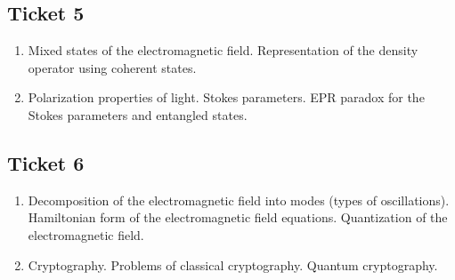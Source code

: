\subsection*{Ticket 5} 
\begin{enumerate}
\item Mixed states of the electromagnetic field.
Representation of the density operator using coherent
states. 
\item Polarization properties of light. Stokes parameters. EPR paradox
  for the Stokes parameters and entangled states.  
\end{enumerate}

\subsection*{Ticket 6} 
\begin{enumerate}
\item Decomposition of the electromagnetic field into modes (types of oscillations).
Hamiltonian form of the electromagnetic field equations.
Quantization of the electromagnetic field. 
\item Cryptography. Problems of classical cryptography. Quantum
  cryptography. 
\end{enumerate}

